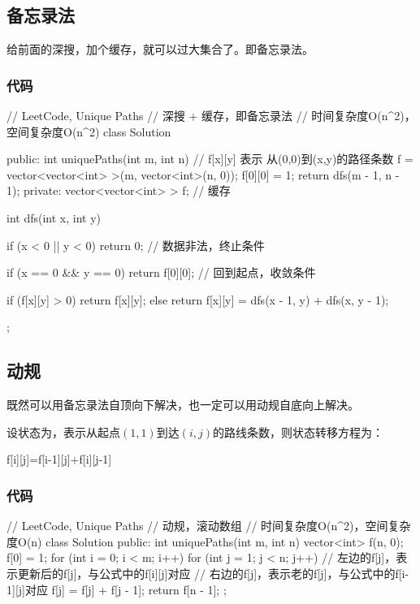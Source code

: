 \subsection{备忘录法}
给前面的深搜，加个缓存，就可以过大集合了。即备忘录法。

\subsubsection{代码}
\begin{Code}
// LeetCode, Unique Paths
// 深搜 + 缓存，即备忘录法
// 时间复杂度O(n^2)，空间复杂度O(n^2)
class Solution {
public:
    int uniquePaths(int m, int n) {
        // f[x][y] 表示 从(0,0)到(x,y)的路径条数
        f = vector<vector<int> >(m, vector<int>(n, 0));
        f[0][0] = 1;
        return dfs(m - 1, n - 1);
    }
private:
    vector<vector<int> > f;  // 缓存

    int dfs(int x, int y) {
        if (x < 0 || y < 0) return 0; // 数据非法，终止条件

        if (x == 0 && y == 0) return f[0][0]; // 回到起点，收敛条件

        if (f[x][y] > 0) {
            return f[x][y];
        } else {
            return f[x][y] = dfs(x - 1, y) +  dfs(x, y - 1);
        }
    }
};
\end{Code}


\subsection{动规}
既然可以用备忘录法自顶向下解决，也一定可以用动规自底向上解决。

设状态为，表示从起点$(1,1)$到达$(i,j)$的路线条数，则状态转移方程为：
\begin{Code}
f[i][j]=f[i-1][j]+f[i][j-1]
\end{Code}


\subsubsection{代码}
\begin{Code}
// LeetCode, Unique Paths
// 动规，滚动数组
// 时间复杂度O(n^2)，空间复杂度O(n)
class Solution {
public:
    int uniquePaths(int m, int n) {
        vector<int> f(n, 0);
        f[0] = 1;
        for (int i = 0; i < m; i++) {
            for (int j = 1; j < n; j++) {
                // 左边的f[j]，表示更新后的f[j]，与公式中的f[i][j]对应
                // 右边的f[j]，表示老的f[j]，与公式中的f[i-1][j]对应
                f[j] = f[j] + f[j - 1];
            }
        }
        return f[n - 1];
    }
};
\end{Code}


